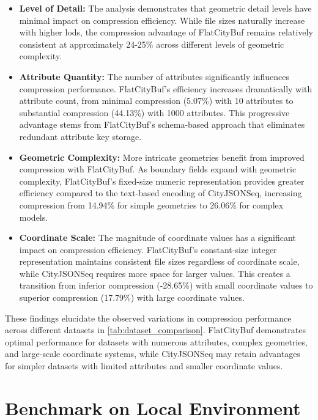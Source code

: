 \begin{itemize}
  \item \textbf{Level of Detail:} The analysis demonstrates that geometric detail levels have minimal impact on compression efficiency. While file sizes naturally increase with higher \ac{lod}s, the compression advantage of FlatCityBuf remains relatively consistent at approximately 24-25\% across different levels of geometric complexity.

  \item \textbf{Attribute Quantity:} The number of attributes significantly influences compression performance. FlatCityBuf's efficiency increases dramatically with attribute count, from minimal compression (5.07\%) with 10 attributes to substantial compression (44.13\%) with 1000 attributes. This progressive advantage stems from FlatCityBuf's schema-based approach that eliminates redundant attribute key storage.

  \item \textbf{Geometric Complexity:} More intricate geometries benefit from improved compression with FlatCityBuf. As boundary fields expand with geometric complexity, FlatCityBuf's fixed-size numeric representation provides greater efficiency compared to the text-based encoding of CityJSONSeq, increasing compression from 14.94\% for simple geometries to 26.06\% for complex models.

  \item \textbf{Coordinate Scale:} The magnitude of coordinate values has a significant impact on compression efficiency. FlatCityBuf's constant-size integer representation maintains consistent file sizes regardless of coordinate scale, while CityJSONSeq requires more space for larger values. This creates a transition from inferior compression (-28.65\%) with small coordinate values to superior compression (17.79\%) with large coordinate values.
\end{itemize}

These findings elucidate the observed variations in compression performance across different datasets in \autoref{tab:dataset_comparison}. FlatCityBuf demonstrates optimal performance for datasets with numerous attributes, complex geometries, and large-scale coordinate systems, while CityJSONSeq may retain advantages for simpler datasets with limited attributes and smaller coordinate values.

\section{Benchmark on Local Environment}
\label{result:benchmark_on_local_environment}

